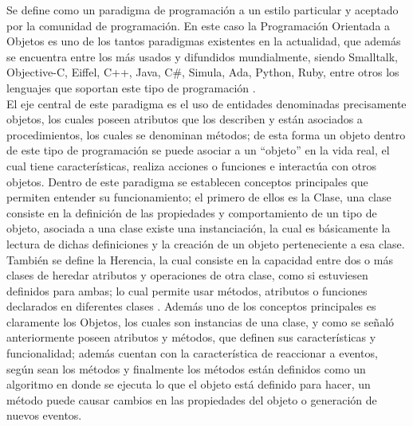 \documentclass[11pt,lettersize]{article} %
\begin{document}
%


Se define como un paradigma de programación a un estilo particular y aceptado por la comunidad de programación. En este caso la Programación Orientada a Objetos es uno de los tantos paradigmas existentes en la actualidad, que además se encuentra entre los más usados y difundidos mundialmente, siendo Smalltalk, Objective-C, Eiffel, C++, Java, C\#, Simula, Ada, Python, Ruby, entre otros los lenguajes que soportan este tipo de programación \cite{Scott2006}. \\

El eje central de este paradigma es el uso de entidades denominadas precisamente objetos, los cuales poseen atributos que los describen y están asociados a procedimientos, los cuales se denominan métodos; de esta forma un objeto dentro de este tipo de programación se puede asociar a un “objeto” en la vida real, el cual tiene características, realiza acciones o funciones e interactúa con otros objetos. Dentro de este paradigma se establecen conceptos principales que permiten entender su funcionamiento; el primero de ellos es la Clase, una clase consiste en la definición de las propiedades y comportamiento de un tipo de objeto, asociada a una clase existe una instanciación, la cual es básicamente la lectura de dichas definiciones y la creación de un objeto perteneciente a esa clase. También se define la Herencia, la cual consiste en la capacidad entre dos o más clases de heredar atributos y operaciones de otra clase, como si estuviesen definidos para ambas; lo cual permite usar métodos, atributos o funciones declarados en diferentes clases \cite{VanRoy2004}. Además uno de los conceptos principales es claramente los Objetos, los cuales son instancias de una clase, y como se señaló anteriormente poseen atributos y métodos, que definen sus características y funcionalidad; además cuentan con la característica de reaccionar a eventos, según sean los métodos y finalmente los métodos están definidos como un algoritmo en donde se ejecuta lo que el objeto está definido para hacer, un método puede causar cambios en las propiedades del objeto o generación de nuevos eventos.\\
\end{document}
